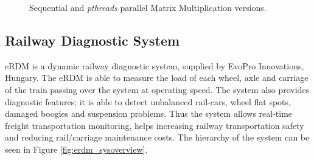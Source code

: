 \begin{figure}[t]
\centering
{}
\caption{Sequential and \emph{pthreads} parallel Matrix Multiplication versions.}
\label{fig:baselineMatMult}
\end{figure}





\subsection{Railway Diagnostic System}

eRDM is a dynamic railway diagnostic system, supplied by EvoPro Innovations, Hungary. The eRDM is able to measure the load of each wheel, axle and carriage of the train passing over the system at operating speed. The system also provides diagnostic features; it is able to detect unbalanced rail-cars, wheel flat spots, damaged boogies and suspension problems. Thus the system allows real-time freight transportation monitoring, helps increasing railway transportation safety and reducing rail/carriage maintenance costs. The hierarchy of the system can be seen in Figure \ref{fig:erdm_sysoverview}.

